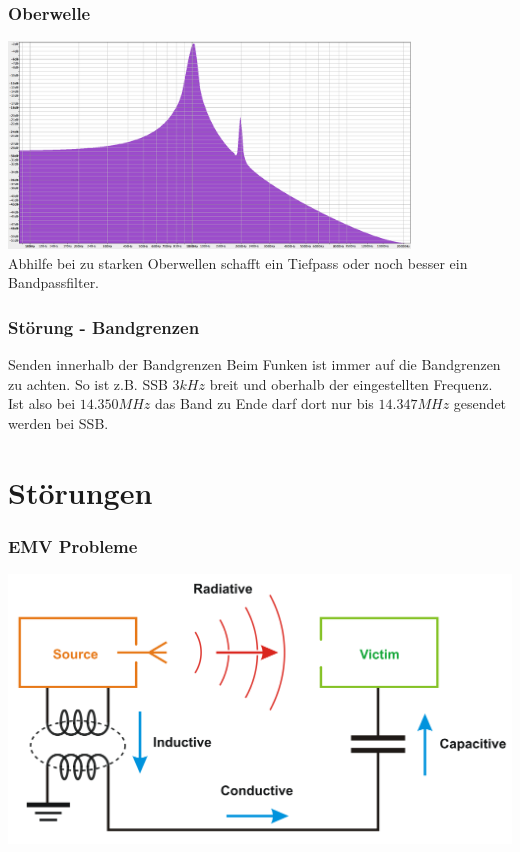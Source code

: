 \begin{frame}
    \frametitle{Oberwelle}
    \begin{center}
		\includegraphics[width=0.8\textwidth]{a19/oberwelle.png}\\ [3em] \large
        Abhilfe bei zu starken Oberwellen schafft ein Tiefpass oder noch besser ein Bandpassfilter.
	\end{center}
\end{frame}

\begin{frame}
    \frametitle{Störung - Bandgrenzen}
    \begin{center}
	\begin{block}{Senden innerhalb der Bandgrenzen}
		Beim Funken ist immer auf die Bandgrenzen zu achten. So ist z.B. SSB $3kHz$ breit und oberhalb der eingestellten Frequenz. Ist also bei $14.350MHz$ das Band zu Ende darf dort nur bis $14.347MHz$ gesendet werden bei SSB.
	\end{block}
    \end{center}
\end{frame}

\section*{Störungen}

\begin{frame}
    \frametitle{EMV Probleme}
    \begin{center}
		\includegraphics[width=1\textwidth]{a19/EMI_coupling_modes.png}\\
        \tiny \hyperlink{refs}{\cite{wm}} \\[1em]
    \end{center}
\end{frame}

